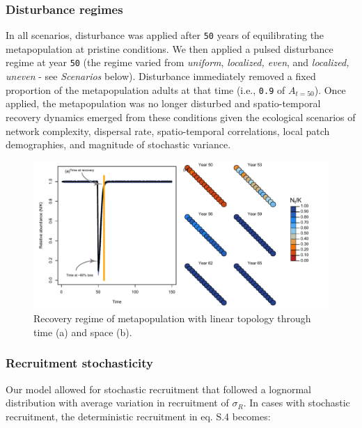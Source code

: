 \documentclass[
]{article}
\begin{document}
\hypertarget{disturbance-regimes}{%
\subsubsection{Disturbance regimes}\label{disturbance-regimes}}

In all scenarios, disturbance was applied after \texttt{50} years of
equilibrating the metapopulation at pristine conditions. We then applied
a pulsed disturbance regime at year \texttt{50} (the regime varied from
\emph{uniform}, \emph{localized, even}, and \emph{localized, uneven} -
see \emph{Scenarios} below). Disturbance immediately removed a fixed
proportion of the metapopulation adults at that time (i.e., \texttt{0.9}
of \(A_{t=50}\)). Once applied, the metapopulation was no longer
disturbed and spatio-temporal recovery dynamics emerged from these
conditions given the ecological scenarios of network complexity,
dispersal rate, spatio-temporal correlations, local patch demographies,
and magnitude of stochastic variance.

\begin{figure}[H]

{\centering \includegraphics{Managing_for_ecological_surprises_in_metapopulations_files/figure-latex/example disturbance regime-1} 

}

\caption{Recovery regime of metapopulation with linear topology through time (a) and space (b).}\label{fig:example disturbance regime}
\end{figure}

\hypertarget{recruitment-stochasticity}{%
\subsubsection{Recruitment
stochasticity}\label{recruitment-stochasticity}}

Our model allowed for stochastic recruitment that followed a lognormal
distribution with average variation in recruitment of \(\sigma_R\). In
cases with stochastic recruitment, the deterministic recruitment in eq.
S.4 becomes:
\end{document}
